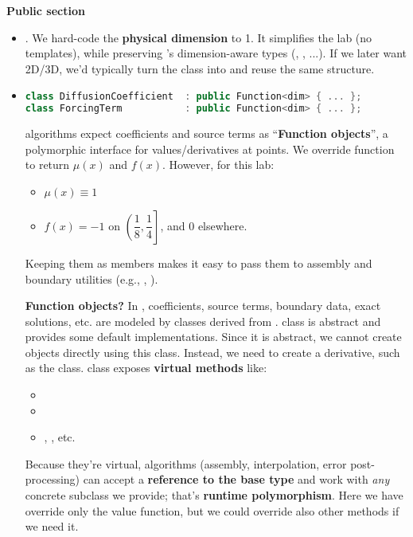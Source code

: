 \begin{flushleft}
    \textcolor{Green3}{ \textbf{Public section}}
\end{flushleft}
\begin{itemize}
    \item {}. We hard-code the \textbf{physical dimension} to 1. It simplifies the lab (no templates), while preserving 's dimension-aware types (, , ...). If we later want 2D/3D, we'd typically turn the class into  and reuse the same structure.
    

    \item {}
    \begin{lstlisting}[language=C++]
class DiffusionCoefficient  : public Function<dim> { ... };
class ForcingTerm           : public Function<dim> { ... };\end{lstlisting}
     algorithms expect coefficients and source terms as ``\textbf{Function objects}'', a polymorphic interface for values/derivatives at points. We override  function to return $\mu(x)$ and $f(x)$. However, for this lab:
    \begin{itemize}
        \item $\mu(x) \equiv 1$
        \item $f(x) = -1$ on $\left.\left(\dfrac{1}{8}, \dfrac{1}{4}\right.\right]$, and $0$ elsewhere.
    \end{itemize}
    Keeping them as members makes it easy to pass them to assembly and boundary utilities (e.g., , ).

    \textcolor{Green3}{ \textbf{Function objects?}} In , coefficients, source terms, boundary data, exact solutions, etc. are modeled by classes derived from .  class is abstract and provides some default implementations. Since it is abstract, we cannot create objects directly using this class. Instead, we need to create a derivative, such as the  class.  class exposes \textbf{virtual methods} like:
    \begin{itemize}
        \item {}
        \item {}
        \item {}, , etc.
    \end{itemize}
    Because they're virtual, algorithms (assembly, interpolation, error post-processing) can accept a \textbf{reference to the base type}  and work with \emph{any} concrete subclass we provide; that's \textbf{runtime polymorphism}. Here we have override only the value function, but we could override also other methods if we need it.



\end{itemize}
